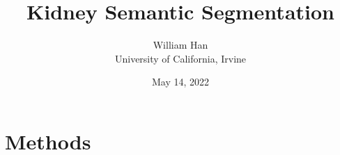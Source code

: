 \documentclass [12pt, letterpaper] {article}
\title{Kidney Semantic Segmentation}
\author{William Han \\ University of California, Irvine}
\date{May 14, 2022}
\begin{document}
\maketitle

\section{Methods}
\end{document}
